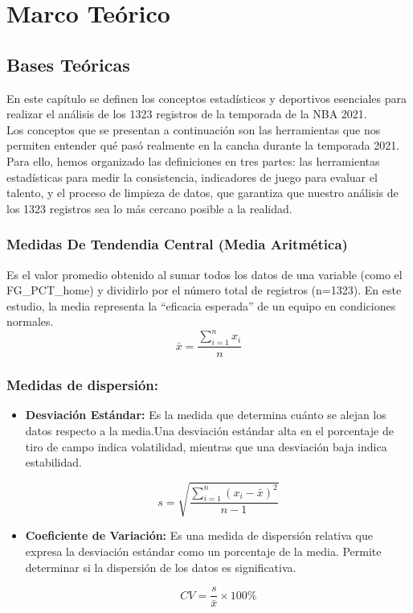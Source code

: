 \documentclass[oneside,11pt]{Latex/Classes/PhDthesisPSnPDF}
\begin{document}
\chapter{Marco Teórico}

\section{Bases Teóricas}

En este capítulo se definen los conceptos estadísticos y deportivos
esenciales para realizar el análisis de los 1323 registros de la
temporada de la NBA 2021.\\

Los conceptos que se presentan a continuación son las herramientas que
nos permiten entender qué pasó realmente en la cancha durante la
temporada 2021. Para ello, hemos organizado las definiciones en tres
partes: las herramientas estadísticas para medir la consistencia,
indicadores de juego para evaluar el talento, y el proceso de limpieza
de datos, que garantiza que nuestro análisis de los 1323 registros sea
lo más cercano posible a la realidad.\\

\subsection{Medidas De Tendendia Central (Media Aritmética)}

Es el valor promedio obtenido al sumar todos los datos de una variable
(como el FG\_PCT\_home) y dividirlo por el número total de registros
(n=1323). En este estudio, la media representa la ``eficacia esperada''
de un equipo en condiciones normales.
\[\bar{x} = \frac{\sum_{i=1}^{n} x_i}{n}\]

\subsection{Medidas de dispersión:}

\begin{itemize}

\item{\textbf{Desviación Estándar:} Es la medida que determina cuánto se alejan los datos respecto a la media.Una desviación estándar alta en el porcentaje de tiro de campo indica volatilidad, mientras que una desviación baja indica estabilidad.}

$$s = \sqrt{\frac{\sum_{i=1}^{n} (x_i - \bar{x})^2}{n-1}}$$

\item{\textbf{Coeficiente de Variación:} Es una medida de dispersión relativa que expresa la desviación estándar como un porcentaje de la media. Permite determinar si la dispersión de los datos es significativa.}

$$CV =  \frac{s}{\bar{x}} \times 100\%$$
\end{itemize}
\end{document}
